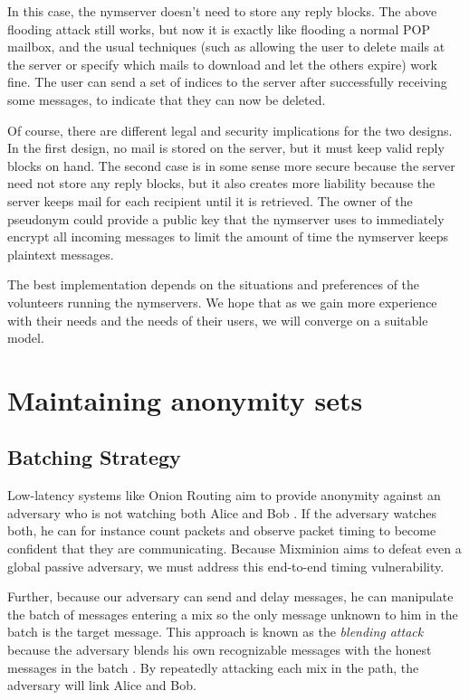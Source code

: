 \documentclass[11pt]{IEEEtran}
\begin{document}
In this case, the nymserver doesn't need to store any reply blocks.
The above flooding attack still works, but now it is exactly
like flooding a normal POP mailbox, and the usual techniques (such as
allowing the user to delete mails at the server or specify which mails to
download and let the others expire) work fine. The user can send a set
of indices to the server after successfully receiving
some messages, to indicate that they can now be deleted.

Of course, there are different legal and security implications for the two
designs. In the first design, no mail is stored on the server, but it must
keep valid reply blocks on hand. The second case is in some sense more
secure because the server need not store any reply blocks, but it also
creates more liability because the server keeps mail for each recipient
until it is retrieved. The owner of the pseudonym could provide a public
key that the nymserver uses to immediately encrypt all incoming messages
to limit the amount of time the nymserver keeps plaintext messages.

The best implementation depends on the situations and preferences of the
volunteers running the nymservers.  We hope that as we gain more experience
with their needs and the needs of their users, we will converge on a suitable
model.


\section{Maintaining anonymity sets}
\label{sec:maintaining-anonymity}

\subsection{Batching Strategy}
\label{subsec:batching}

Low-latency systems like Onion Routing aim to provide anonymity against an
adversary who is not watching both Alice and Bob \cite{onion-routing}. If
the adversary watches both, he can for instance count packets and observe
packet timing to become confident that they are communicating. Because
Mixminion aims to defeat even a global passive adversary, we must address
this end-to-end timing vulnerability.

Further, because our adversary can send and delay messages,
he can manipulate the batch of messages entering a mix so the only message
unknown to him in the batch is the target message. This approach is
known as the \emph{blending attack} because the adversary blends his
own recognizable messages with the honest messages in the batch
\cite{batching-taxonomy}. By repeatedly
attacking each mix in the path, the adversary will link Alice and Bob.
\end{document}
